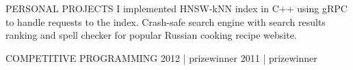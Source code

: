 \documentclass[12pt]{cutecv}
\begin{document}
\begin{paracol}{2}
\begin{rightcolumn}
\begin{cvsection}{PERSONAL PROJECTS}
  {I implemented HNSW-kNN index in C++ using gRPC to
    handle requests to the index.}
  {}
  {Crash-safe search engine with search results
   ranking and spell checker for popular Russian cooking recipe website.}
\end{cvsection}
\begin{cvsection}{COMPETITIVE PROGRAMMING}
  {2012 | prizewinner}
  {}
  {2011 | prizewinner}
  {}
\end{cvsection}

\end{rightcolumn}
\end{paracol}
\end{document}
